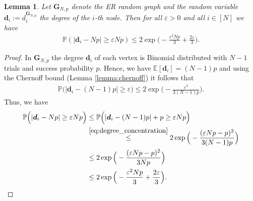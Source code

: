 \documentclass[a4paper,
               10pt,
               pdftex,
               normalheadings,
               headsepline,
               footsepline,
               headinclude,
               footinclude,
               DIV=14,
               abstracton]
{scrartcl}
\newtheorem{lemma}[theorem]{Lemma}
\newcommand{\rv}[1]{\bm{#1}}
\begin{document}
\begin{lemma} \label{lemma:A_ER_degrees}
Let $\rv{G}_{N,p}$ denote the ER random graph and the random variable $\rv{d}_i := d_i^{\rv{G}_{N,p}}$ the degree of the $i$-th node.
Then for all $\varepsilon > 0$ and all $i \in [N]$ we have
\begin{align}
    \mathbb{P}(|\rv{d}_i - Np| \geq \varepsilon Np) \leq 2 \exp\Big( -\frac{\varepsilon^2 N p}{3} + \frac{2 \varepsilon}{3}\Big).  
\end{align}
\end{lemma}
\begin{proof}
    In $\rv{G}_{N,p}$ the degree $\rv{d}_i$ of each vertex is Binomial distributed with $N-1$ trials and success probability $p$.
    Hence, we have $\mathbb{E}[\rv{d}_i] = (N-1)p$ and using the Chernoff bound (Lemma \ref{lemma:chernoff}) it follows that
    \begin{align}
        \mathbb{P}\Big(|\rv{d}_i - (N-1)p| \geq \varepsilon \Big) \leq 2 \exp\Big(-\frac{\varepsilon^2}{3 (N-1) p}\Big).
        \label{eq:degree_concentration}
    \end{align}
    Thus, we have
    \begin{align}
        \mathbb{P}\Big(|\rv{d}_i - Np| \geq \varepsilon N p \Big) &\leq \mathbb{P}\Big(|\rv{d}_i - (N-1) p| + p \geq \varepsilon N p \Big)\\
        &\overset{\eqref{eq:degree_concentration}}{\leq} 2 \exp\Big(-\frac{(\varepsilon N p - p)^2}{3 (N-1) p}\Big)\\
        &\leq 2 \exp\Big(-\frac{(\varepsilon N p - p)^2}{3Np}\Big)\\
        &\leq 2 \exp\Big(-\frac{\varepsilon^2 N p}{3} + \frac{2 \varepsilon}{3}\Big).
    \end{align}
\end{proof}
\end{document}
